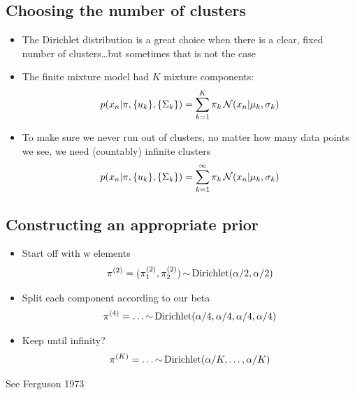 \documentclass[b5paper]{report}
\begin{document}
\subsection{Choosing the number of clusters}

\begin{itemize}
  \item The Dirichlet distribution is a great choice when there is a clear,
    fixed number of clusters\dots but sometimes that is not the case
  \item The finite mixture model had $K$ mixture components:
    \begin{equation}
      p(x_n|\pi, \{u_k\}, \{\Sigma_k\}) = \sum_{k=1}^K \pi_k \operatorname*{\mathcal{N}}(x_n|\mu_k,
      \sigma_k)
    \end{equation}
  \item To make sure we never run out of clusters, no matter how many data
    points we see, we need (countably) infinite clusters
    \begin{equation}
      p(x_n|\pi, \{u_k\}, \{\Sigma_k\}) = \sum_{k=1}^\infty \pi_k \operatorname*{\mathcal{N}}(x_n|\mu_k,
      \sigma_k)
    \end{equation}
\end{itemize}

\subsection{Constructing an appropriate prior}

\begin{itemize}
  \item Start off with w elements
    \begin{equation}
      \pi^{(2)} = (\pi_1^{(2)}, \pi_2^{(2)}) \operatorname*{\sim} \text{Dirichlet}(\alpha/2,
      \alpha/2)
    \end{equation}
  \item Split each component according to our beta
    \begin{align}
      \pi^{(4)} = \dots \operatorname*{\sim} \text{Dirichlet}(\alpha/4,
      \alpha/4,\alpha/4,\alpha/4)
    \end{align}
  \item Keep until infinity?
    \begin{align}
      \pi^{(K)} = \dots \operatorname*{\sim} \text{Dirichlet}(\alpha/K,\dots,\alpha/K)
    \end{align}
\end{itemize}

See Ferguson 1973 \cite{ferguson1973bayesian}
\end{document}
